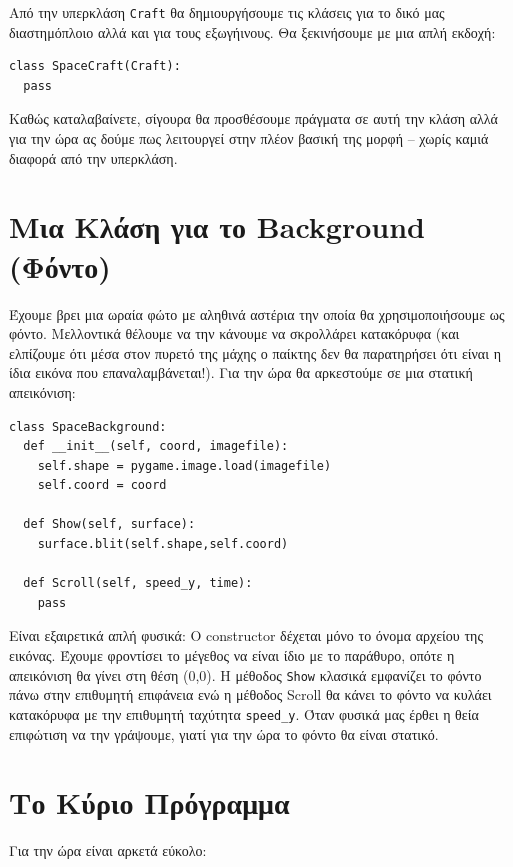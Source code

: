 Από την υπερκλάση {\tt Craft} θα δημιουργήσουμε τις κλάσεις για το δικό μας διαστημόπλοιο αλλά και για τους εξωγήινους. Θα ξεκινήσουμε με μια απλή εκδοχή:

\begin{verbatim}
class SpaceCraft(Craft):
  pass
\end{verbatim}

Καθώς καταλαβαίνετε, σίγουρα θα προσθέσουμε πράγματα σε αυτή την κλάση αλλά για την ώρα ας δούμε πως λειτουργεί στην πλέον βασική της μορφή -- χωρίς καμιά διαφορά από την υπερκλάση.

\section{Μια Κλάση για το Background (Φόντο)}

Έχουμε βρει μια ωραία φώτο με αληθινά αστέρια την οποία θα χρησιμοποιήσουμε ως φόντο. Μελλοντικά θέλουμε να την κάνουμε να σκρολλάρει κατακόρυφα (και ελπίζουμε ότι μέσα στον πυρετό της μάχης ο παίκτης δεν θα παρατηρήσει ότι είναι η ίδια εικόνα που επαναλαμβάνεται!). Για την ώρα θα αρκεστούμε σε μια στατική απεικόνιση:

\begin{verbatim}
class SpaceBackground:
  def __init__(self, coord, imagefile):
    self.shape = pygame.image.load(imagefile)
    self.coord = coord

  def Show(self, surface):
    surface.blit(self.shape,self.coord)

  def Scroll(self, speed_y, time):
    pass
\end{verbatim}

Είναι εξαιρετικά απλή φυσικά: Ο constructor δέχεται μόνο το όνομα αρχείου
της εικόνας. Έχουμε φροντίσει το μέγεθος να είναι ίδιο με το παράθυρο, οπότε
η απεικόνιση θα γίνει στη θέση (0,0). Η μέθοδος {\tt Show} κλασικά εμφανίζει το
φόντο πάνω στην επιθυμητή επιφάνεια ενώ η μέθοδος Scroll θα κάνει το φόντο
να κυλάει κατακόρυφα με την επιθυμητή ταχύτητα {\tt speed\_y}. Όταν φυσικά μας έρθει η θεία επιφώτιση να την γράψουμε, γιατί για την ώρα το φόντο θα είναι στατικό.

\section{Το Κύριο Πρόγραμμα}

Για την ώρα είναι αρκετά εύκολο:

